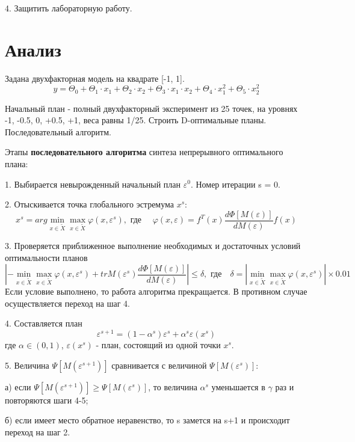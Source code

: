 4.	Защитить лабораторную работу.


\section{Анализ}

Задана двухфакторная модель на квадрате [-1, 1].
\[ y = \Theta_0 + \Theta_1 \cdot x_1 + \Theta_2 \cdot x_2 + 
\Theta_3 \cdot x_1 \cdot x_2 + \Theta_4 \cdot x_1^2 + \Theta_5 \cdot x_2^2 \]

Начальный план - полный двухфакторный эксперимент из 25 точек, на уровнях -1, -0.5, 0, +0.5, +1, веса равны 1/25.
Строить D-оптимальные планы. Последовательный алгоритм.


Этапы {\bf последовательного алгоритма} синтеза непрерывного оптимального плана:

1. Выбирается невырожденный начальный план $\varepsilon^0$. Номер итерации s = 0.

2. Отыскивается точка глобального эстремума $x^s$:
\[ x^s = arg \min_{x \in \tilde{X}} \max_{x \in \tilde{X}} \varphi(x, \varepsilon^s), \text{ где } \quad \varphi(x, \varepsilon) = f^T(x) \frac{d\Phi [M(\varepsilon)] }{ dM(\varepsilon) } f(x) \]

3. Проверяется приближенное выполнение необходимых и достаточных условий оптимальности планов
\[ \left| - \min_{x \in \tilde{X}} \max_{x \in \tilde{X}} \varphi(x, \varepsilon^s)
 + tr M(\varepsilon^s)  \frac{d\Phi [M(\varepsilon)] }{ dM(\varepsilon) } \right| \leq \delta,
\text{ где} \quad \delta = \left| \min_{x \in \tilde{X}} \max_{x \in \tilde{X}} \varphi(x, \varepsilon^s) \right| \times 0.01 \]
Если условие выполнено, то работа алгоритма прекращается. В противном случае осуществляется переход на шаг 4.

4. Составляется план
\[ \varepsilon^{s+1} = (1 - \alpha^s) \varepsilon^s + \alpha^s \varepsilon(x^s)\]
где $\alpha \in (0,1)$, $\varepsilon(x^s)$ - план, состоящий из одной точки $x^s$.


5. Величина $\Psi[M(\varepsilon^{s+1})]$ сравнивается с величиной $\Psi[M(\varepsilon^{s})]$:

а) если $\Psi[M(\varepsilon^{s+1})] \geq \Psi[M(\varepsilon^{s})]$, то величина $\alpha^s$ уменьшается в
$\gamma$ раз и повторяются шаги 4-5;

б) если имеет место обратное неравенство, то s замется на s+1 и происходит переход на шаг 2.
\vspace{5mm}



